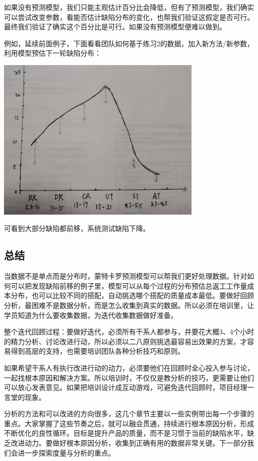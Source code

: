 如果没有预测模型，我们只能主观估计百分比会降低，但有了预测模型，我们确实可以尝试改变参数，看能否估计缺陷分布的变化，也帮我们验证这假定是否可行。最终我们验证了确实这个百分比是可行。如果没有预测模型便难以做到。

例如，延续前面例子，下面看看团队如何基于练习2的数据，加入新方法/新参数，利用模型预估下一轮缺陷分布：


\includegraphics[width=10cm]{微信截图_20211207132712.png}

可看到大部分缺陷都前移，系统测试缺陷下降。

\hypertarget{ux603bux7ed3}{%
\subsection{总结}\label{ux603bux7ed3}}

当数据不是单点而是分布时，蒙特卡罗预测模型可以帮我们更好处理数据。针对如何可以把发现缺陷前移的例子里，模型可以从每个过程的分布预估总返工工作量成本分布，也可以比较不同的搭配，自动挑选哪个搭配的质量成本最低。要做好回顾分析，最困难不是数据分析，而是怎么收集到真实的数据。所以必须在培训里，让学员知道为什么要收集数据，为迭代收集数据做好准备。

整个迭代回顾过程：要做好迭代，必须所有干系人都参与，并要花大概3、4个小时的精力分析、讨论改进行动，所以必须以二八原则挑选最容易出效果的方案，才容易得到高层的支持，也需要培训团队各种分析技巧和原则。

如果希望干系人有执行改进行动的动力，必须要他们在回顾时全心投入参与讨论，一起找根本原因和解决方案。所以培训时，不仅仅是教分析的技巧，更需要让他们可以放心发表意见。如果把培训设计成互动游戏，可避免迭代回顾时，项目经理一言堂的现象。

分析的方法和可以改进的方向很多，这几个章节主要以一些实例带出每一个步骤的重点。大家掌握了这些节奏之后，就可以融会贯通，持续进行根本原因分析，形成不断优化的良性循环。目标是提升产品的质量，而不是习惯于当前的缺陷水平，缺乏改进动力。要做好根本原因分析，收集到正确有用的数据非常关键。下一部分我们会进一步探索度量与分析的重点。

